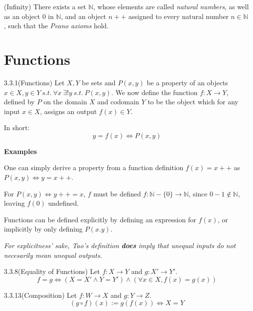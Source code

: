 \documentclass[letterpaper]{article}
\begin{document}
\begin{axbox}{3.8}{(Infinity)}
  There exists a set $\mathbb{N}$, whose elements are called \textit{natural numbers}, as well as an object $0$ in $\mathbb{N}$, and an object $n++$ assigned to every natural number $n \in \mathbb{N}$, such that the \textit{Peano axioms} hold.
\end{axbox}

\newpage

\section*{Functions}

\begin{defbox}{3.3.1}{(Functions)}
  Let $X,Y$ be sets and $P(x,y)$ be a property of an objects $x \in X, y \in Y ~s.t.~ \forall x ~ \exists! y ~s.t.~ P(x,y)$. We now define the function $f: X \to Y$, defined by $P$ on the domain $X$ and codomain $Y$ to be the object which for any input $x \in X$, assigns an output $f(x) \in Y$.\\

  \medskip

  In short:
  \[
    y = f(x) \iff P(x,y)
  \]

  \medskip

  \textbf{Examples}

  One can simply derive a property from a function definition $f(x) = x++$ as $P(x,y) \iff y = x++$.

  \medskip

  For $P(x,y) \iff y++ = x$, $f$ must be defined $f: \mathbb{N}-\{0\} \to \mathbb{N}$, since $0-1 \notin \mathbb{N}$, leaving $f(0)$ undefined.

  \bigskip\bigskip

  Functions can be defined explicitly by defining an expression for $f(x)$, or implicitly by only defining $P(x.y)$.

  \bigskip\bigskip

  \textit{For explicitness' sake, Tao's definition \textbf{does} imply that unequal inputs do not necesarily mean unequal outputs.}
\end{defbox}

\begin{defbox}{3.3.8}{(Equality of Functions)}
  Let $f: X \to Y$ and $g: X' \to Y'$.
  \[
    f = g \iff (X = X' \land Y = Y') \land (\forall x \in X, f(x) = g(x))
  \]
\end{defbox}

\begin{defbox}{3.3.13}{(Composition)}
  Let $f: W \to X$ and $g: Y \to Z$.
  \[
    (g \circ f)(x) := g(f(x)) \iff X = Y
  \]
\end{defbox}
\end{document}
